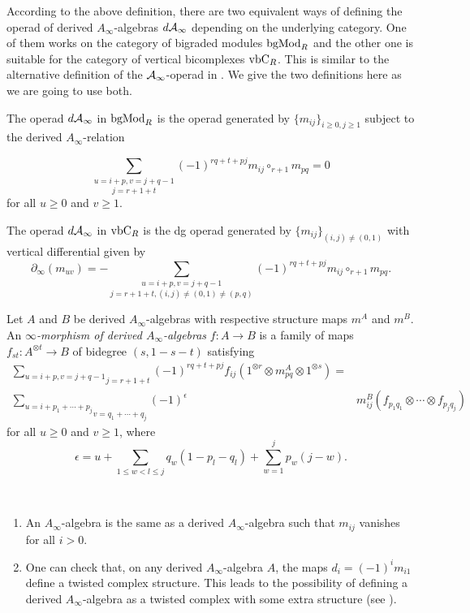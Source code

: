 \documentclass[Thesis.tex]{subfiles}
\begin{document}
According to the above definition, there are two equivalent ways of defining the operad of derived $A_\infty$-algebras $d\mathcal{A}_\infty$ depending on the underlying category. One of them works on the category of bigraded modules $\mathrm{bgMod}_R$ and the other one is suitable for the category of vertical bicomplexes $\mathrm{vbC}_R$. This is similar to the alternative definition of the $\mathcal{A}_\infty$-operad in . We give the two definitions here as we are going to use both.

\begin{defin}
The operad $d\mathcal{A}_\infty$ in $\mathrm{bgMod}_R$ is the operad generated by $\{m_{ij}\}_{i\geq 0,j\geq 1}$ subject to the derived $A_\infty$-relation

\[\underset{j=r+1+t}{\sum_{u=i+p, v=j+q-1}}(-1)^{rq+t+pj}m_{ij}\circ_{r+1} m_{pq}=0\]
for all $u\geq 0$ and $v\geq 1$. 

The operad $d\mathcal{A}_\infty$ in $\mathrm{vbC}_R$ is the dg operad generated by $\{m_{ij}\}_{(i,j)\neq (0,1)}$ with vertical differential given by
\[\partial_\infty(m_{uv})=-\underset{j=r+1+t, (i,j)\neq (0,1)\neq (p,q)}{\sum_{u=i+p, v=j+q-1}}(-1)^{rq+t+pj}m_{ij}\circ_{r+1} m_{pq}.\] %
\end{defin}


\begin{defin}
Let $A$ and $B$ be derived $A_\infty$-algebras with respective structure maps $m^A$ and $m^B$. An \emph{$\infty$-morphism of derived $A_\infty$-algebras} $f:A\to B$ is a family of maps $f_{st}:A^{\otimes t}\to B$ of bidegree $(s,1-s-t)$ satisfying
\begin{align}\label{dinftymaps}
\underset{j=r+1+t}{\sum_{u=i+p, v=j+q-1}}(-1)^{rq+t+pj}f_{ij}(1^{\otimes r}\otimes m_{pq}^A\otimes 1^{\otimes s})=&\\
\underset{v=q_1+\cdots +q_j}{\sum_{u=i+p_1+\cdots +p_j}}(-1)^{\epsilon} & m^B_{ij}(f_{p_1 q_1}\otimes\cdots\otimes f_{p_j q_j})\nonumber
\end{align}
for all $u\geq 0$ and $v\geq 1$, where
\[\epsilon = u + \sum_{1\leq w < l \leq j} q_w(1-p_l-q_l)  + \sum_{w=1}^j p_w(j-w).\]
\end{defin}
\begin{ex}\
\begin{enumerate}
\item An $A_\infty$-algebra is the same as a derived $A_\infty$-algebra such that $m_{ij}$ vanishes for all $i>0$.
\item One can check that, on any derived $A_\infty$-algebra $A$, the maps $d_i=(-1)^{i}m_{i1}$ define a twisted complex structure. This leads to the possibility of defining a derived $A_\infty$-algebra as a twisted complex with some extra structure (see ).

\end{enumerate}
\end{ex}
\end{document}
